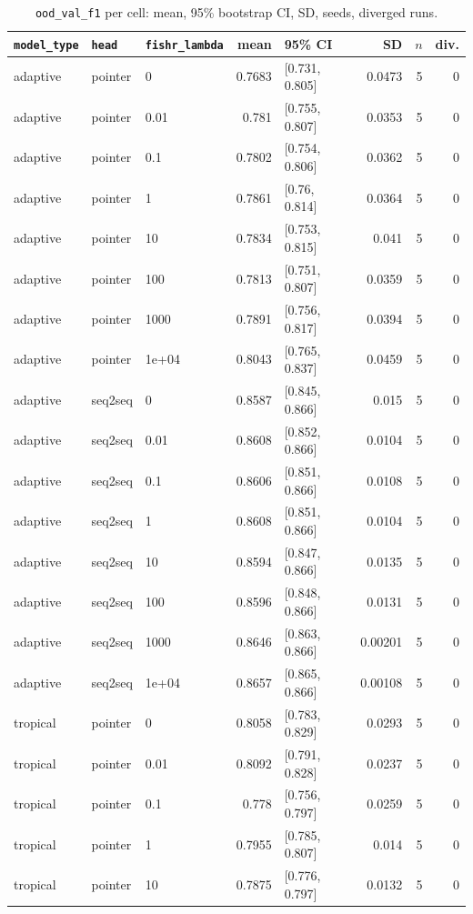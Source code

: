 \documentclass[10pt]{article}
\begin{document}
{\small
\begin{longtable}{lllrlrrr}
\caption{\texttt{ood\_val\_f1} per cell: mean, 95\% bootstrap CI, SD, seeds, diverged runs.}\label{tab:summary-ood_val_f1}\\
\toprule
\texttt{model\_type} & \texttt{head} & \texttt{fishr\_lambda} & mean & 95\% CI & SD & $n$ & div.\\
\midrule
\endhead
adaptive & pointer & 0 & 0.7683 & [0.731, 0.805] & 0.0473 & 5 & 0\\
adaptive & pointer & 0.01 & 0.781 & [0.755, 0.807] & 0.0353 & 5 & 0\\
adaptive & pointer & 0.1 & 0.7802 & [0.754, 0.806] & 0.0362 & 5 & 0\\
adaptive & pointer & 1 & 0.7861 & [0.76, 0.814] & 0.0364 & 5 & 0\\
adaptive & pointer & 10 & 0.7834 & [0.753, 0.815] & 0.041 & 5 & 0\\
adaptive & pointer & 100 & 0.7813 & [0.751, 0.807] & 0.0359 & 5 & 0\\
adaptive & pointer & 1000 & 0.7891 & [0.756, 0.817] & 0.0394 & 5 & 0\\
adaptive & pointer & 1e+04 & 0.8043 & [0.765, 0.837] & 0.0459 & 5 & 0\\
adaptive & seq2seq & 0 & 0.8587 & [0.845, 0.866] & 0.015 & 5 & 0\\
adaptive & seq2seq & 0.01 & 0.8608 & [0.852, 0.866] & 0.0104 & 5 & 0\\
adaptive & seq2seq & 0.1 & 0.8606 & [0.851, 0.866] & 0.0108 & 5 & 0\\
adaptive & seq2seq & 1 & 0.8608 & [0.851, 0.866] & 0.0104 & 5 & 0\\
adaptive & seq2seq & 10 & 0.8594 & [0.847, 0.866] & 0.0135 & 5 & 0\\
adaptive & seq2seq & 100 & 0.8596 & [0.848, 0.866] & 0.0131 & 5 & 0\\
adaptive & seq2seq & 1000 & 0.8646 & [0.863, 0.866] & 0.00201 & 5 & 0\\
adaptive & seq2seq & 1e+04 & 0.8657 & [0.865, 0.866] & 0.00108 & 5 & 0\\
tropical & pointer & 0 & 0.8058 & [0.783, 0.829] & 0.0293 & 5 & 0\\
tropical & pointer & 0.01 & 0.8092 & [0.791, 0.828] & 0.0237 & 5 & 0\\
tropical & pointer & 0.1 & 0.778 & [0.756, 0.797] & 0.0259 & 5 & 0\\
tropical & pointer & 1 & 0.7955 & [0.785, 0.807] & 0.014 & 5 & 0\\
tropical & pointer & 10 & 0.7875 & [0.776, 0.797] & 0.0132 & 5 & 0\\

\end{longtable}}
\end{document}
